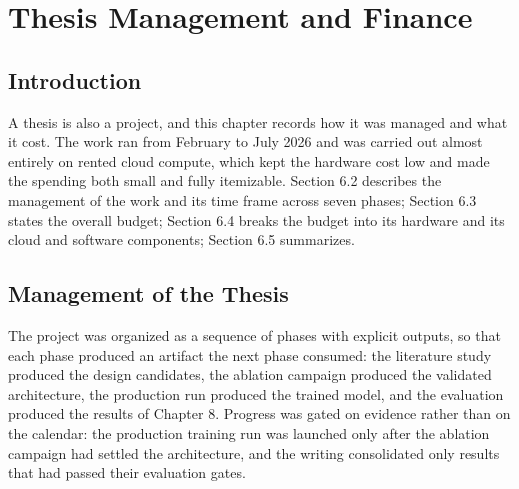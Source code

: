 \chapter{Thesis Management and Finance}

\section{Introduction}
A thesis is also a project, and this chapter records how it was managed
and what it cost. The work ran from February to July 2026 and was carried
out almost entirely on rented cloud compute, which kept the hardware cost
low and made the spending both small and fully itemizable. Section 6.2
describes the management of the work and its time frame across seven
phases; Section 6.3 states the overall budget; Section 6.4 breaks the
budget into its hardware and its cloud and software components; Section
6.5 summarizes.

\FloatBarrier
\section{Management of the Thesis}
The project was organized as a sequence of phases with explicit outputs,
so that each phase produced an artifact the next phase consumed: the
literature study produced the design candidates, the ablation campaign
produced the validated architecture, the production run produced the
trained model, and the evaluation produced the results of Chapter 8.
Progress was gated on evidence rather than on the calendar: the
production training run was launched only after the ablation campaign
had settled the architecture, and the writing consolidated only results
that had passed their evaluation gates.

